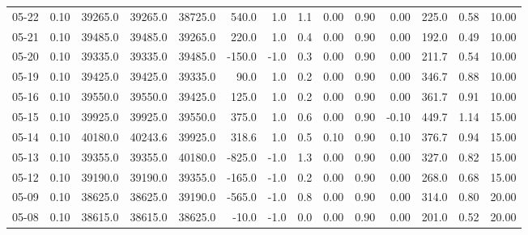 \begin{threeparttable}
{\begin{tabular}{lrrrrrrrrrrrrr}
  05-22 &     0.10 & 39265.0 & 39265.0 & 38725.0 &      540.0 &                      1.0 &                 1.1 &       0.00 &      0.90 &           0.00 &            225.0 &            0.58 &                  10.00 \\
  05-21 &     0.10 & 39485.0 & 39485.0 & 39265.0 &      220.0 &                      1.0 &                 0.4 &       0.00 &      0.90 &           0.00 &            192.0 &            0.49 &                  10.00 \\
  05-20 &     0.10 & 39335.0 & 39335.0 & 39485.0 &     -150.0 &                     -1.0 &                 0.3 &       0.00 &      0.90 &           0.00 &            211.7 &            0.54 &                  10.00 \\
  05-19 &     0.10 & 39425.0 & 39425.0 & 39335.0 &       90.0 &                      1.0 &                 0.2 &       0.00 &      0.90 &           0.00 &            346.7 &            0.88 &                  10.00 \\
  05-16 &     0.10 & 39550.0 & 39550.0 & 39425.0 &      125.0 &                      1.0 &                 0.2 &       0.00 &      0.90 &           0.00 &            361.7 &            0.91 &                  10.00 \\
  05-15 &     0.10 & 39925.0 & 39925.0 & 39550.0 &      375.0 &                      1.0 &                 0.6 &       0.00 &      0.90 &          -0.10 &            449.7 &            1.14 &                  15.00 \\
  05-14 &     0.10 & 40180.0 & 40243.6 & 39925.0 &      318.6 &                      1.0 &                 0.5 &       0.10 &      0.90 &           0.10 &            376.7 &            0.94 &                  15.00 \\
  05-13 &     0.10 & 39355.0 & 39355.0 & 40180.0 &     -825.0 &                     -1.0 &                 1.3 &       0.00 &      0.90 &           0.00 &            327.0 &            0.82 &                  15.00 \\
  05-12 &     0.10 & 39190.0 & 39190.0 & 39355.0 &     -165.0 &                     -1.0 &                 0.2 &       0.00 &      0.90 &           0.00 &            268.0 &            0.68 &                  15.00 \\
  05-09 &     0.10 & 38625.0 & 38625.0 & 39190.0 &     -565.0 &                     -1.0 &                 0.8 &       0.00 &      0.90 &           0.00 &            314.0 &            0.80 &                  20.00 \\
  05-08 &     0.10 & 38615.0 & 38615.0 & 38625.0 &      -10.0 &                     -1.0 &                 0.0 &       0.00 &      0.90 &           0.00 &            201.0 &            0.52 &                  20.00 \\

\end{tabular}}
\end{threeparttable}
